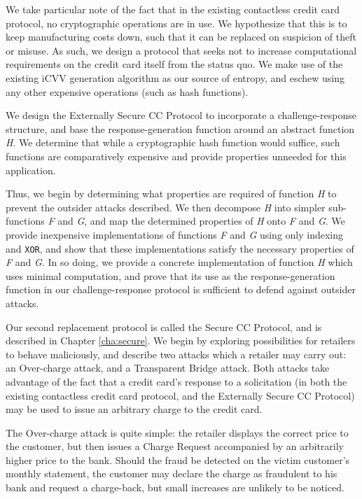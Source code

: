 We take particular note of the fact that in the existing contactless credit card protocol, no cryptographic operations are in use.
We hypothesize that this is to keep manufacturing costs down, such that it can be replaced on suspicion of theft or misuse.
As such, we design a protocol that seeks not to increase computational requirements on the credit card itself from the status quo.
We make use of the existing iCVV generation algorithm as our source of entropy, and eschew using any other expensive operations (such as hash functions).

We design the Externally Secure CC Protocol to incorporate a challenge-response structure,
    and base the response-generation function around an abstract function \emph{H}.
We determine that while a cryptographic hash function would suffice, such functions are comparatively expensive and provide properties unneeded for this application.

Thus, we begin by determining what properties are required of function \emph{H} to prevent the outsider attacks described.
We then decompose \emph{H} into simpler sub-functions \emph{F} and \emph{G}, and map the determined properties of \emph{H} onto \emph{F} and \emph{G}.
We provide inexpensive implementations of functions \emph{F} and \emph{G} using only indexing and \texttt{XOR},
    and show that these implementations satisfy the necessary properties of \emph{F} and \emph{G}.
In so doing, we provide a concrete implementation of function \emph{H} which uses minimal computation,
    and prove that its use as the response-generation function in our challenge-response protocol is sufficient to defend against outsider attacks.


Our second replacement protocol is called the Secure CC Protocol, and is described in Chapter \ref{cha:secure}.
We begin by exploring possibilities for retailers to behave maliciously, and describe two attacks which a retailer may carry out:
    an Over-charge attack, and a Transparent Bridge attack.
Both attacks take advantage of the fact that a credit card's response to a solicitation
    (in both the existing contactless credit card protocol, and the Externally Secure CC Protocol)
    may be used to issue an arbitrary charge to the credit card.

The Over-charge attack is quite simple:
    the retailer displays the correct price to the customer, but then issues a Charge Request accompanied by an arbitrarily higher price to the bank.
Should the fraud be detected on the victim customer's monthly statement, the customer may declare the charge as fraudulent to his bank and request a charge-back,
    but small increases are unlikely to be noticed.

